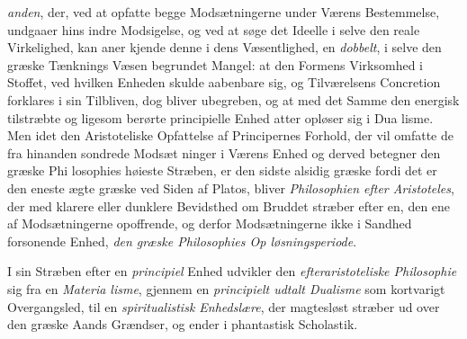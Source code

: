 \emph{anden}, der, ved at opfatte begge Modsætningerne under
Værens Bestemmelse, undgaaer hins indre Modsigelse, og ved
at søge det Ideelle i selve den reale Virkelighed, kan aner\-%
kjende denne i dens Væsentlighed, en \emph{dobbelt}, i selve den
græske Tænknings Væsen begrundet Mangel: at den Formens
Virksomhed i Stoffet, ved hvilken Enheden skulde aabenbare
sig, og Tilværelsens Concretion forklares i sin Tilbliven, dog
bliver ubegreben, og at med det Samme den energisk tilstræbte
og ligesom berørte principielle Enhed atter opløser sig i Dua\-%
lisme. Men idet den Aristoteliske Opfattelse af Principernes
Forhold, der vil omfatte de fra hinanden sondrede Modsæt\-%
ninger i Værens Enhed og derved betegner den græske Phi\-%
losophies høieste Stræben, er den sidste alsidig græske fordi
det er den eneste ægte græske ved Siden af Platos, bliver
\emph{Philosophien efter Aristoteles}, der med klarere eller
dunklere Bevidsthed om Bruddet stræber efter en, den ene af
Modsætningerne opoffrende, og derfor Modsætningerne ikke i
Sandhed forsonende Enhed, \emph{den græske Philosophies Op\-%
løsningsperiode}.

I sin Stræben efter en \emph{principiel} Enhed udvikler den
\emph{efteraristoteliske Philosophie} sig fra en \emph{Materia\-%
lisme}, gjennem en \emph{principielt udtalt Dualisme} som
kortvarigt Overgangsled, til en \emph{spiritualistisk Enhedslære},
der magtesløst stræber ud over den græske Aands Grændser,
og ender i phantastisk Scholastik.

